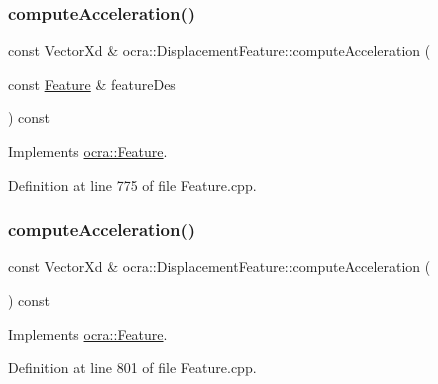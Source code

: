 \subsubsection{\texorpdfstring{compute\+Acceleration()}{computeAcceleration()}\hspace{0.1cm}{\footnotesize\ttfamily [1/2]}}
{\footnotesize\ttfamily const Vector\+Xd \& ocra\+::\+Displacement\+Feature\+::compute\+Acceleration (\begin{DoxyParamCaption}\item[{const \hyperlink{classocra_1_1Feature}{Feature} \&}]{feature\+Des }\end{DoxyParamCaption}) const\hspace{0.3cm}{\ttfamily [virtual]}}



Implements \hyperlink{classocra_1_1Feature_a4a5973d27459d2dececec8dc73038df8}{ocra\+::\+Feature}.



Definition at line 775 of file Feature.\+cpp.

\hypertarget{classocra_1_1DisplacementFeature_a1f2fa6644359c3897ac8d3e4e06c5f81}{}\label{classocra_1_1DisplacementFeature_a1f2fa6644359c3897ac8d3e4e06c5f81} 
\subsubsection{\texorpdfstring{compute\+Acceleration()}{computeAcceleration()}\hspace{0.1cm}{\footnotesize\ttfamily [2/2]}}
{\footnotesize\ttfamily const Vector\+Xd \& ocra\+::\+Displacement\+Feature\+::compute\+Acceleration (\begin{DoxyParamCaption}{ }\end{DoxyParamCaption}) const\hspace{0.3cm}{\ttfamily [virtual]}}



Implements \hyperlink{classocra_1_1Feature_aa42b61d4255116caa92042d01ca36b79}{ocra\+::\+Feature}.



Definition at line 801 of file Feature.\+cpp.

\hypertarget{classocra_1_1DisplacementFeature_a328fae77ec8a9942881e42226250a11b}{}\label{classocra_1_1DisplacementFeature_a328fae77ec8a9942881e42226250a11b} 
